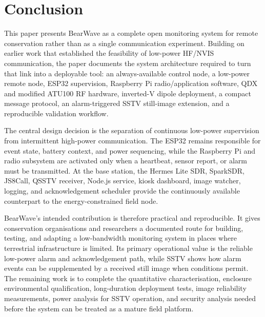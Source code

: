 \documentclass[acmsmall,screen]{acmart}
\begin{document}
\section{Conclusion}
This paper presents BearWave as a complete open monitoring system for remote conservation rather than as a single communication experiment. Building on earlier work that established the feasibility of low-power HF/NVIS communication, the paper documents the system architecture required to turn that link into a deployable tool: an always-available control node, a low-power remote node, ESP32 supervision, Raspberry Pi radio/application software, QDX and modified ATU100 RF hardware, inverted-V dipole deployment, a compact message protocol, an alarm-triggered SSTV still-image extension, and a reproducible validation workflow.

The central design decision is the separation of continuous low-power supervision from intermittent high-power communication. The ESP32 remains responsible for event state, battery context, and power sequencing, while the Raspberry Pi and radio subsystem are activated only when a heartbeat, sensor report, or alarm must be transmitted. At the base station, the Hermes Lite SDR, SparkSDR, JS8Call, QSSTV receiver, Node.js service, kiosk dashboard, image watcher, logging, and acknowledgement scheduler provide the continuously available counterpart to the energy-constrained field node.

BearWave's intended contribution is therefore practical and reproducible. It gives conservation organisations and researchers a documented route for building, testing, and adapting a low-bandwidth monitoring system in places where terrestrial infrastructure is limited. Its primary operational value is the reliable low-power alarm and acknowledgement path, while SSTV shows how alarm events can be supplemented by a received still image when conditions permit. The remaining work is to complete the quantitative characterisation, enclosure environmental qualification, long-duration deployment tests, image reliability measurements, power analysis for SSTV operation, and security analysis needed before the system can be treated as a mature field platform.



\end{document}
